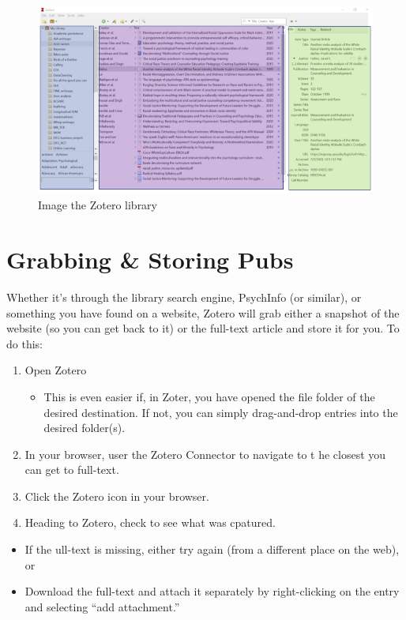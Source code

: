 \documentclass[
  english,
]{book}
\providecommand{\tightlist}{%
  \setlength{\itemsep}{0pt}\setlength{\parskip}{0pt}}
\begin{document}
\begin{figure}
\centering
\includegraphics{images/Zotero/Zotero_library.png}
\caption{Image the Zotero library}
\end{figure}

\hypertarget{grabbing-storing-pubs}{%
\section{Grabbing \& Storing Pubs}\label{grabbing-storing-pubs}}

Whether it's through the library search engine, PsychInfo (or similar), or something you have found on a website, Zotero will grab either a snapshot of the website (so you can get back to it) or the full-text article and store it for you. To do this:

\begin{enumerate}
\def\labelenumi{\arabic{enumi}.}
\tightlist
\item
  Open Zotero

  \begin{itemize}
  \tightlist
  \item
    This is even easier if, in Zoter, you have opened the file folder of the desired destination. If not, you can simply drag-and-drop entries into the desired folder(s).
  \end{itemize}
\item
  In your browser, user the Zotero Connector to navigate to t he closest you can get to full-text.
\item
  Click the Zotero icon in your browser.
\item
  Heading to Zotero, check to see what was cpatured.
\end{enumerate}

\begin{itemize}
\tightlist
\item
  If the ull-text is missing, either try again (from a different place on the web), or
\item
  Download the full-text and attach it separately by right-clicking on the entry and selecting ``add attachment.''
\end{itemize}
\end{document}
